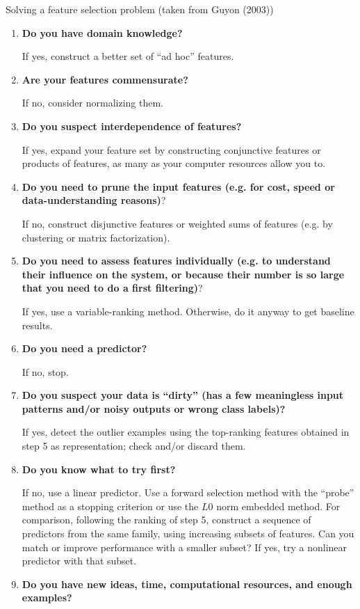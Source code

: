 \documentclass[11pt,compress,t,notes=noshow, xcolor=table]{beamer}
\begin{document}


  \begin{vbframe}{Solving a feature selection problem (taken from Guyon (2003))}

    \begin{enumerate}
      \item {\bf Do you have domain knowledge?}

        If yes, construct a better set of \enquote{ad hoc} features.
      \item {\bf Are your features commensurate?}

        If no, consider normalizing them.
      \item {\bf Do you suspect interdependence of features?}

      If yes, expand your feature set by constructing conjunctive features or products of features, as many as your computer resources allow you to.
      \item {\bf Do you need to prune the input features (e.g. for cost, speed or data-understanding reasons)}?

      If no, construct disjunctive features or weighted sums of features (e.g. by clustering or matrix factorization).
      \item {\bf Do you need to assess features individually (e.g. to understand their influence on the system, or because their number is so large that you need to do a first filtering)}?

      If yes, use a variable-ranking method.
      Otherwise, do it anyway to get baseline results.
      \item {\bf Do you need a predictor?}

      If no, stop.
      \item {\bf Do you suspect your data is \enquote{dirty} (has a few meaningless input patterns and/or noisy outputs or wrong class labels)?}

      If yes, detect the outlier examples using the top-ranking features obtained in step 5 as representation; check and/or discard them.
      \item {\bf Do you know what to try first?}

      If no, use a linear predictor.
      Use a forward selection method with the \enquote{probe} method as a stopping criterion or use the $L0$ norm embedded method.
      For comparison, following the ranking of step 5, construct a sequence of predictors from the same family, using increasing subsets of features.
      Can you match or improve performance with a smaller subset?
      If yes, try a nonlinear predictor with that subset.
      \item {\bf Do you have new ideas, time, computational resources, and enough examples?}


\end{enumerate}
\end{vbframe}
\end{document}
